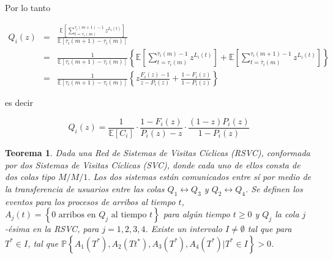 \documentclass{article}
\newtheorem{Teo}{Teorema}
\newcommand{\esp}{\mathbb{E}}
\newcommand{\prob}{\mathbb{P}}
\begin{document}
Por lo tanto

\begin{eqnarray*}
Q_{i}\left(z\right)&=&\frac{\esp\left[\sum_{t=\tau_{i}\left(m\right)}^{\tau_{i}
\left(m+1\right)-1}z^{L_{i}\left(t\right)}\right]}{\esp\left[\tau_{i}\left(m+1\right)-\tau_{i}\left(m\right)\right]}\\
&=&\frac{1}{\esp\left[\tau_{i}\left(m+1\right)-\tau_{i}\left(m\right)\right]}
\left\{
\esp\left[\sum_{t=\tau_{i}\left(m\right)}^{\overline{\tau}_{i}\left(m\right)-1}
z^{L_{i}\left(t\right)}\right]
+\esp\left[\sum_{t=\overline{\tau}_{i}\left(m\right)}^{\tau_{i}\left(m+1\right)-1}
z^{L_{i}\left(t\right)}\right]\right\}\\
&=&\frac{1}{\esp\left[\tau_{i}\left(m+1\right)-\tau_{i}\left(m\right)\right]}
\left\{
z\frac{F_{i}\left(z\right)-1}{z-P_{i}\left(z\right)}+\frac{1-F_{i}\left(z\right)}
{1-P_{i}\left(z\right)}
\right\}
\end{eqnarray*}

es decir

\begin{equation}
Q_{i}\left(z\right)=\frac{1}{\esp\left[C_{i}\right]}\cdot\frac{1-F_{i}\left(z\right)}{P_{i}\left(z\right)-z}\cdot\frac{\left(1-z\right)P_{i}\left(z\right)}{1-P_{i}\left(z\right)}
\end{equation}

\begin{Teo}
Dada una Red de Sistemas de Visitas C\'iclicas (RSVC), conformada por dos Sistemas de Visitas C\'iclicas (SVC), donde cada uno de ellos consta de dos colas tipo $M/M/1$. Los dos sistemas est\'an comunicados entre s\'i por medio de la transferencia de usuarios entre las colas $Q_{1}\leftrightarrow Q_{3}$ y $Q_{2}\leftrightarrow Q_{4}$. Se definen los eventos para los procesos de arribos al tiempo $t$, $A_{j}\left(t\right)=\left\{0 \textrm{ arribos en }Q_{j}\textrm{ al tiempo }t\right\}$ para alg\'un tiempo $t\geq0$ y $Q_{j}$ la cola $j$-\'esima en la RSVC, para $j=1,2,3,4$.  Existe un intervalo $I\neq\emptyset$ tal que para $T^{*}\in I$, tal que $\prob\left\{A_{1}\left(T^{*}\right),A_{2}\left(Tt^{*}\right),
A_{3}\left(T^{*}\right),A_{4}\left(T^{*}\right)|T^{*}\in I\right\}>0$.
\end{Teo}
\end{document}
